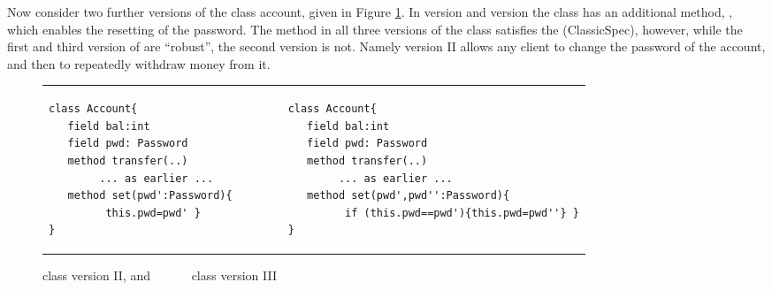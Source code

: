   
 
 Now consider two further versions of the class account, given in Figure \ref{fig:ExampleAccount}.
 In version {} and version {} the class has an additional method, , which enables the resetting of the password.
The method  in all three versions of the class  satisfies the (ClassicSpec), 
however, while the first and third version of  are ``robust'', the second version is not.
Namely version II allows any client to change the password of the account, and then to repeatedly withdraw 
money from it.
  
%
  
  
 
 \begin{figure}[hbtp]
 \begin{tabular}{lll}
\begin{minipage}{0.35\textwidth}
\begin{lstlisting}
class Account{
   field bal:int 
   field pwd: Password 
   method transfer(..) 
        ... as earlier ...
   method set(pwd':Password){
         this.pwd=pwd' }
}   
\end{lstlisting}
\end{minipage}
  &\ \ \  \ \   &
\begin{minipage}{0.50\textwidth}
\begin{lstlisting}
class Account{
   field bal:int 
   field pwd: Password 
   method transfer(..) 
        ... as earlier ...
   method set(pwd',pwd'':Password){
         if (this.pwd==pwd'){this.pwd=pwd''} }
}
\end{lstlisting}
\end{minipage} 
 \end{tabular}
  \caption{class  version II, and \ \ \ \ \ \  class  version III}
 \label{fig:ExampleAccount}
 \end{figure}

